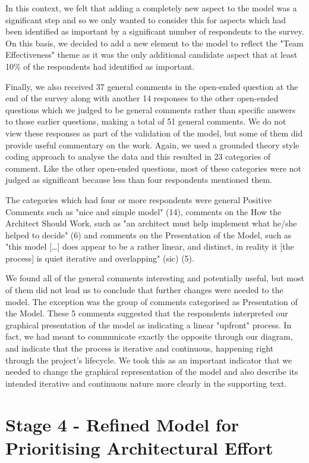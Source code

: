 In this context, we felt that adding a completely new aspect to the model was a significant step and so we only wanted to consider this for aspects which had been identified as important by a significant number of respondents to the survey.  On this basis, we decided to add a new element to the model to reflect the "Team Effectiveness" theme as it was the only additional candidate aspect that at least 10\% of the respondents had identified as important.

Finally, we also received 37 general comments in the open-ended question at the end of the survey along with another 14 responses to the other open-ended questions which we judged to be general comments rather than specific answers to those earlier questions, making a total of 51 general comments.  We do not view these responses as part of the validation of the model, but some of them did provide useful commentary on the work.  Again, we used a grounded theory style coding approach to analyse the data and this resulted in 23 categories of comment.  Like the other open-ended questions, most of these categories were not judged as significant because less than four respondents mentioned them.

The categories which had four or more respondents were general Positive Comments such as "nice and simple model" (14), comments on the How the Architect Should Work, such as "an architect must help implement what he/she helped to decide" (6) and comments on the Presentation of the Model, such as "this model [\ldots] does appear to be a rather linear, and distinct,  in reality it [the process] is quiet iterative and overlapping" (sic) (5).

We found all of the general comments interesting and potentially useful, but most of them did not lead us to conclude that further changes were needed to the model.  The exception was the group of comments categorised as Presentation of the Model.  These 5 comments suggested that the respondents interpreted our graphical presentation of the model as indicating a linear "upfront" process.  In fact, we had meant to communicate exactly the opposite through our diagram, and indicate that the process is iterative and continuous, happening right through the project's lifecycle.  We took this as an important indicator that we needed to change the graphical representation of the model and also describe its intended iterative and continuous nature more clearly in the supporting text.

\section{Stage 4 - Refined Model for Prioritising Architectural Effort}

